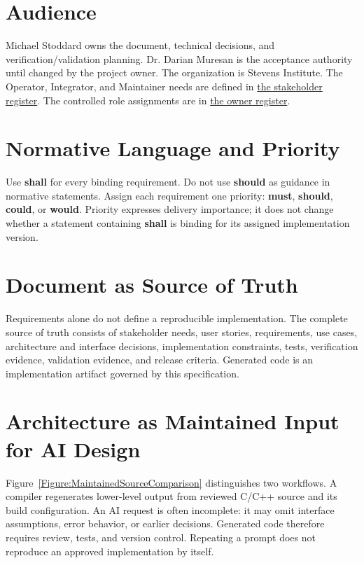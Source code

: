 \section{Audience}
Michael Stoddard owns the document, technical decisions, and verification/validation planning. Dr. Darian Muresan is the acceptance authority until changed by the project owner. The organization is Stevens Institute. The Operator, Integrator, and Maintainer needs are defined in \hyperref[Table:StakeholderNeeds]{the stakeholder register}. The controlled role assignments are in \hyperref[Table:ProjectOwners]{the owner register}.

\section{Normative Language and Priority}
Use \textbf{shall} for every binding requirement. Do not use \textbf{should} as
guidance in normative statements. Assign each requirement one priority:
\textbf{\gls{must}}, \textbf{\gls{should}}, \textbf{\gls{could}}, or
\textbf{\gls{would}}. Priority expresses delivery importance; it does not change
whether a statement containing \textbf{shall} is binding for its assigned
implementation version.

\section{Document as Source of Truth}
Requirements alone do not define a reproducible implementation. The complete
source of truth consists of stakeholder needs, user stories, requirements, use
cases, architecture and interface decisions, implementation constraints,
tests, verification evidence, validation evidence, and release criteria.
Generated code is an implementation artifact governed by this specification.

\section{Architecture as Maintained Input for AI Design}
\label{Section:ArchitectureAIDesign}
Figure~\ref{Figure:MaintainedSourceComparison} distinguishes two workflows.
A compiler regenerates lower-level output from reviewed C/C++ source and its
build configuration. An AI request is often incomplete: it may omit interface
assumptions, error behavior, or earlier decisions. Generated code therefore
requires review, tests, and version control. Repeating a prompt does not
reproduce an approved implementation by itself.

